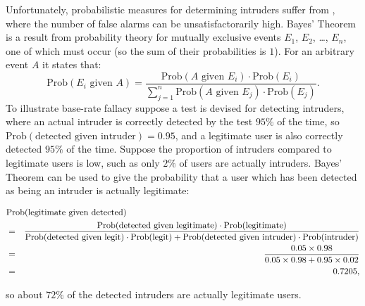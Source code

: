 Unfortunately, probabilistic measures for determining intruders suffer from
, where the number of false alarms can be unsatisfactorarily high.
Bayes' Theorem is a result from probability theory for mutually
exclusive events $E_1$, $E_2$, \dots, $E_n$, one of which must occur
(so the sum of their probabilities is $1$). For an arbitrary event $A$ it states that:
\begin{displaymath}
  \mbox{Prob}(E_i \mbox{ given } A) =
  \frac{\mbox{Prob}(A \mbox{ given } E_i)\cdot\mbox{Prob}(E_i)}
  {\sum_{j=1}^{n}\mbox{Prob}(A \mbox{ given } E_j)\cdot\mbox{Prob}(E_j)}.
\end{displaymath}
To illustrate base-rate fallacy suppose a test is devised for detecting
intruders, where an actual intruder is correctly detected by the test $95\%$ of the
time, so $\mbox{Prob}(\mbox{detected given intruder})=0.95$,
and a legitimate user is also correctly detected $95\%$ of the time.
Suppose the proportion of intruders compared to legitimate users is low,
such as only $2\%$ of users are actually intruders.
Bayes' Theorem can be used to give the probability that a user which has been detected
as being an intruder is actually legitimate:

\begin{scriptsize}\begin{eqnarray*}
  \lefteqn{\mbox{Prob}(\mbox{legitimate given detected})} \\
  &=& \frac{\mbox{Prob}(\mbox{detected given legitimate})\cdot\mbox{Prob}(\mbox{legitimate})}
  {\mbox{Prob}(\mbox{detected given legit} )\cdot\mbox{Prob}(\mbox{legit}) +
  \mbox{Prob}(\mbox{detected given intruder} )\cdot\mbox{Prob}(\mbox{intruder})} \\
  &=& \frac{0.05\times0.98}{0.05\times0.98+0.95\times0.02} \\
  &=& 0.7205,
\end{eqnarray*}\end{scriptsize}
so about $72\%$ of the detected intruders are actually legitimate users.

